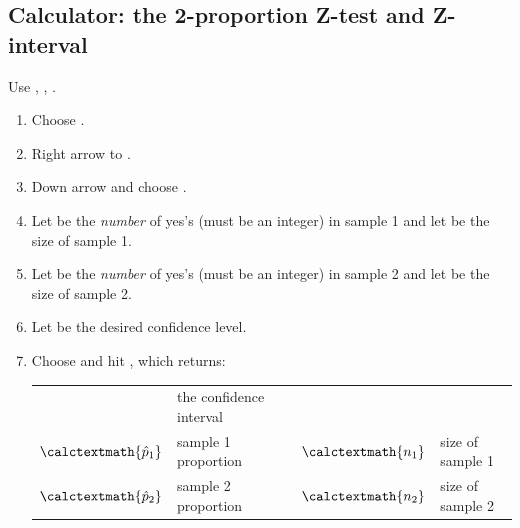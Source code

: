 \subsection{Calculator: the 2-proportion Z-test and Z-interval}

\begin{termBox}{
Use , , .
\begin{enumerate}
\setlength{\itemsep}{0mm}
\item Choose .
\item Right arrow to .
\item Down arrow and choose .
\item Let  be the \emph{number} of yes's (must be an integer) in sample 1 and let  be the size of sample 1.
\item Let  be the \emph{number} of yes's (must be an integer) in sample 2 and let  be the size of sample 2.
\item Let  be the desired confidence level.
\item Choose  and hit , which returns: \\
\begin{tabular}{ll l ll}
\calctext{(\underline{\ \ },\underline{\ \ })} & the confidence interval \\
$\calctextmath{\hat{p}_1}$ & sample 1 proportion &\quad&
	$\calctextmath{n_1}$ & size of sample 1 \\
$\calctextmath{\hat{p}_2}$ & sample 2 proportion &&
	$\calctextmath{n_2}$ &  size of sample 2
\end{tabular}
\end{enumerate}
}
\end{termBox}

